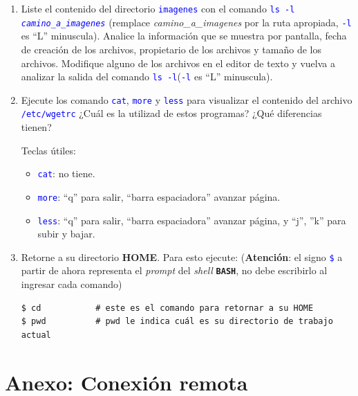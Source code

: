\documentclass[12pt]{article}
\newcommand{\cw}[1]{\texttt{\textcolor{blue}{#1}}}
\newcommand{\bash}{\textbf{\texttt{BASH}}}
\begin{document}
\begin{enumerate}[resume]
    \item Liste el contenido del directorio \cw{imagenes} con el comando \cw{ls
        -l \emph{camino\_a\_imagenes}} (remplace \emph{camino\_a\_imagenes}
        por la ruta apropiada, \cw{-l} es ``L'' minuscula). Analice la
        información que se muestra por pantalla, fecha de creación de los
        archivos, propietario de los archivos y tamaño de los archivos.
        Modifique alguno de los archivos en el editor de texto y vuelva a
        analizar la salida del comando \cw{ls -l}(\cw{-l} es ``L'' minuscula).

    \item Ejecute los comando \cw{cat}, \cw{more} y \cw{less} para visualizar
        el contenido del archivo \cw{/etc/wgetrc} ¿Cuál es la utilizad de
        estos programas? ¿Qué diferencias tienen?

    Teclas útiles:

    \begin{itemize}

        \itemsep2pt \parskip0pt 

        \item \cw{cat}: no tiene.

        \item \cw{more}: ``q'' para salir, ``barra espaciadora'' avanzar
            página.

        \item \cw{less}: ``q'' para salir, ``barra espaciadora'' avanzar
            página, y ``j'', ''k'' para subir y bajar.

    \end{itemize}

    \item Retorne a su directorio \textbf{HOME}. Para esto ejecute:
        (\textbf{Atención}: el signo \cw{\$} a partir de ahora representa el
        \emph{prompt} del \emph{shell} \bash, no debe escribirlo al ingresar
        cada comando)

        \begin{verbatim}
$ cd           # este es el comando para retornar a su HOME
$ pwd          # pwd le indica cuál es su directorio de trabajo actual
        \end{verbatim}

\end{enumerate}

\clearpage
\section*{Anexo: Conexión remota}
\label{sec:anexoConexion}
\end{document}
